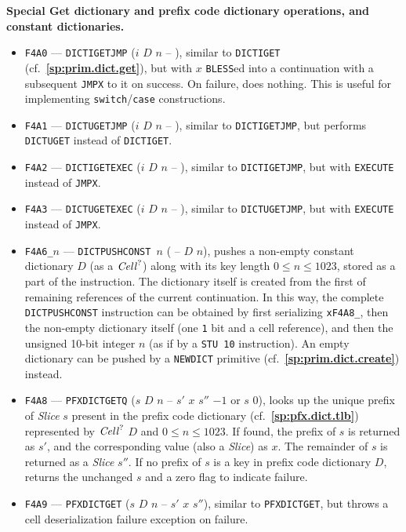 \documentclass[12pt,oneside]{article}
\def\makepoint#1{\medbreak\noindent{\bf #1.\ }}
\def\nxsubpoint{\refstepcounter{subsubsection}%
    \smallbreak\makepoint{\thesubsubsection}}
\def\refpoint#1{{\rm\textbf{\ref{#1}}}}
\let\ptref=\refpoint
\def\emb#1{\textbf{#1.}}
\begin{document}
\nxsubpoint\label{sp:prim.dict.get.spec}\emb{Special {\sc Get} dictionary and prefix code dictionary operations, and constant dictionaries}
\begin{itemize}
\item {\tt F4A0} --- {\tt DICTIGETJMP} ($i$ $D$ $n$ -- ), similar to {\tt DICTIGET} (cf.~\ptref{sp:prim.dict.get}), but with $x$ {\tt BLESS}ed into a continuation with a subsequent {\tt JMPX} to it on success. On failure, does nothing. This is useful for implementing {\tt switch}/{\tt case} constructions.
\item {\tt F4A1} --- {\tt DICTUGETJMP} ($i$ $D$ $n$ -- ), similar to {\tt DICTIGETJMP}, but performs {\tt DICTUGET} instead of {\tt DICTIGET}.
\item {\tt F4A2} --- {\tt DICTIGETEXEC} ($i$ $D$ $n$ -- ), similar to {\tt DICTIGETJMP}, but with {\tt EXECUTE} instead of {\tt JMPX}.
\item {\tt F4A3} --- {\tt DICTUGETEXEC} ($i$ $D$ $n$ -- ), similar to {\tt DICTUGETJMP}, but with {\tt EXECUTE} instead of {\tt JMPX}.
\item {\tt F4A6\_$n$} --- {\tt DICTPUSHCONST $n$} ( -- $D$ $n$), pushes a non-empty constant dictionary $D$ (as a $\textit{Cell\/}^?$) along with its key length $0\leq n\leq 1023$, stored as a part of the instruction. The dictionary itself is created from the first of remaining references of the current continuation. In this way, the complete {\tt DICTPUSHCONST} instruction can be obtained by first serializing {\tt xF4A8\_}, then the non-empty dictionary itself (one {\tt 1} bit and a cell reference), and then the unsigned 10-bit integer $n$ (as if by a {\tt STU 10} instruction). An empty dictionary can be pushed by a {\tt NEWDICT} primitive (cf.~\ptref{sp:prim.dict.create}) instead.
\item {\tt F4A8} --- {\tt PFXDICTGETQ} ($s$ $D$ $n$ -- $s'$ $x$ $s''$ $-1$ or $s$ $0$), looks up the unique prefix of {\em Slice} $s$ present in the prefix code dictionary (cf.~\ptref{sp:pfx.dict.tlb}) represented by $\textit{Cell\/}^?$ $D$ and $0\leq n\leq 1023$. If found, the prefix of $s$ is returned as $s'$, and the corresponding value (also a {\em Slice}) as $x$. The remainder of $s$ is returned as a {\em Slice\/} $s''$. If no prefix of $s$ is a key in prefix code dictionary $D$, returns the unchanged $s$ and a zero flag to indicate failure.
\item {\tt F4A9} --- {\tt PFXDICTGET} ($s$ $D$ $n$ -- $s'$ $x$ $s''$), similar to {\tt PFXDICTGET}, but throws a cell deserialization failure exception on failure.

\end{itemize}
\end{document}
